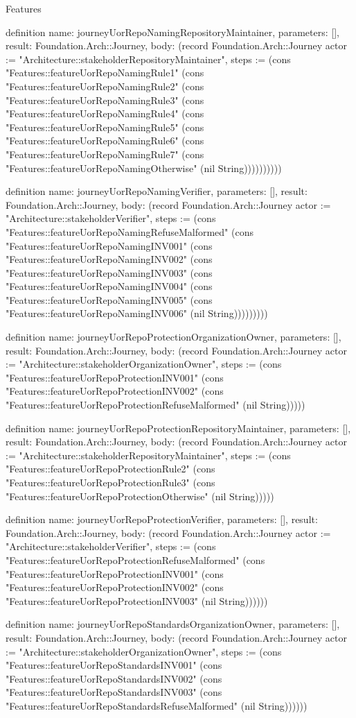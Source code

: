\begin{lexlean}{Features}
\begin{semanticmodule}
definition{
  name: journeyUorRepoNamingRepositoryMaintainer,
  parameters: [],
  result: Foundation.Arch::Journey,
  body: (record Foundation.Arch::Journey {actor := "Architecture::stakeholderRepositoryMaintainer", steps := (cons "Features::featureUorRepoNamingRule1" (cons "Features::featureUorRepoNamingRule2" (cons "Features::featureUorRepoNamingRule3" (cons "Features::featureUorRepoNamingRule4" (cons "Features::featureUorRepoNamingRule5" (cons "Features::featureUorRepoNamingRule6" (cons "Features::featureUorRepoNamingRule7" (cons "Features::featureUorRepoNamingOtherwise" (nil String)))))))))})
}

definition{
  name: journeyUorRepoNamingVerifier,
  parameters: [],
  result: Foundation.Arch::Journey,
  body: (record Foundation.Arch::Journey {actor := "Architecture::stakeholderVerifier", steps := (cons "Features::featureUorRepoNamingRefuseMalformed" (cons "Features::featureUorRepoNamingINV001" (cons "Features::featureUorRepoNamingINV002" (cons "Features::featureUorRepoNamingINV003" (cons "Features::featureUorRepoNamingINV004" (cons "Features::featureUorRepoNamingINV005" (cons "Features::featureUorRepoNamingINV006" (nil String))))))))})
}

definition{
  name: journeyUorRepoProtectionOrganizationOwner,
  parameters: [],
  result: Foundation.Arch::Journey,
  body: (record Foundation.Arch::Journey {actor := "Architecture::stakeholderOrganizationOwner", steps := (cons "Features::featureUorRepoProtectionINV001" (cons "Features::featureUorRepoProtectionINV002" (cons "Features::featureUorRepoProtectionRefuseMalformed" (nil String))))})
}

definition{
  name: journeyUorRepoProtectionRepositoryMaintainer,
  parameters: [],
  result: Foundation.Arch::Journey,
  body: (record Foundation.Arch::Journey {actor := "Architecture::stakeholderRepositoryMaintainer", steps := (cons "Features::featureUorRepoProtectionRule2" (cons "Features::featureUorRepoProtectionRule3" (cons "Features::featureUorRepoProtectionOtherwise" (nil String))))})
}

definition{
  name: journeyUorRepoProtectionVerifier,
  parameters: [],
  result: Foundation.Arch::Journey,
  body: (record Foundation.Arch::Journey {actor := "Architecture::stakeholderVerifier", steps := (cons "Features::featureUorRepoProtectionRefuseMalformed" (cons "Features::featureUorRepoProtectionINV001" (cons "Features::featureUorRepoProtectionINV002" (cons "Features::featureUorRepoProtectionINV003" (nil String)))))})
}

definition{
  name: journeyUorRepoStandardsOrganizationOwner,
  parameters: [],
  result: Foundation.Arch::Journey,
  body: (record Foundation.Arch::Journey {actor := "Architecture::stakeholderOrganizationOwner", steps := (cons "Features::featureUorRepoStandardsINV001" (cons "Features::featureUorRepoStandardsINV002" (cons "Features::featureUorRepoStandardsINV003" (cons "Features::featureUorRepoStandardsRefuseMalformed" (nil String)))))})
}


\end{semanticmodule}
\end{lexlean}
